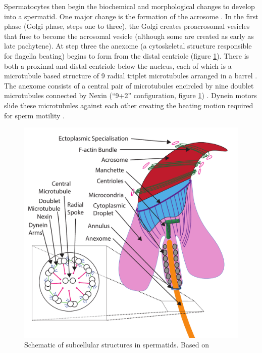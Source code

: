 Spermatocytes then begin the biochemical and morphological changes to develop into a spermatid.
One major change is the formation of the acrosome \parencite[reviewed in][]{Buffone2016Sperm, Khawar2019Mechanism}.
In the first phase (Golgi phase, steps one to three), the Golgi creates proacrosomal vesicles that fuse to become the acrosomal vesicle (although some are created as early as late pachytene).
At step three the anexome (a cytoskeletal structure responsible for flagella beating) begins to form from the distal centriole (figure \ref{fig:Spermatids}).
There is both a proximal and distal centriole below the nucleus, each of which is a microtubule based structure of 9 radial triplet microtubules arranged in a barrel \parencite{Fawcett1969fine, Avidor-Reiss2019It}.
The anexome consists of a central pair of microtubules encircled by nine doublet microtubules connected by Nexin (``9+2'' configuration, figure \ref{fig:Spermatids}) \parencite{Linck2016axoneme, Lehti2017Formation}.
Dynein motors slide these microtubules against each other creating the beating motion required for sperm motility \parencite{Mitchison2010How}.


\begin{figure}[H]
	\centering
	\includegraphics[width=\textwidth]{figures/intro/spermatozoa.pdf}
	\caption[Spermatids]{Schematic of subcellular structures in spermatids. Based on \parencite{Dunleavy2019cytoskeleton, Wei2018acroframosomeacroplaxomemanchette, ODonnell2012Essential, Kopera2010Sertoli, Wang2019Insight, Gunes2020Microtubular}}
	\label{fig:Spermatids}
\end{figure}


